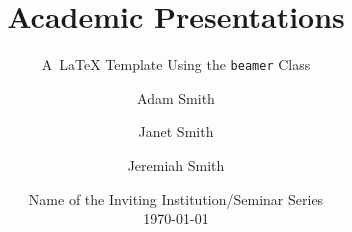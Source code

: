 

\newcommand{\balA}[1][1]{BAL$^\mathup{I}_{#1:#1}$\xspace}
\newcommand{\unbalA}[1][n]{UNBAL$^\mathup{I}_{1:#1}$\xspace}
\newcommand{\balB}[1][1]{BAL$^\mathup{II}_{#1:#1}$\xspace}
\newcommand{\unbalB}[1][n]{UNBAL$^\mathup{II}_{#1:1}$\xspace}


\title{Academic Presentations}

\subtitle{A~LaTeX Template Using the \texttt{beamer} Class}


\author[Smith, Smith, and Smith]{%
	Adam Smith \and
	\alert{Janet Smith} \and
	Jeremiah Smith
} %


\date[\the\year]{%
	Name of the Inviting Institution/Seminar Series \\[\medskipamount]
	\textmd{\today}%
}






\begin{frame}[standout]{~}

\titlepage%

\end{frame}


